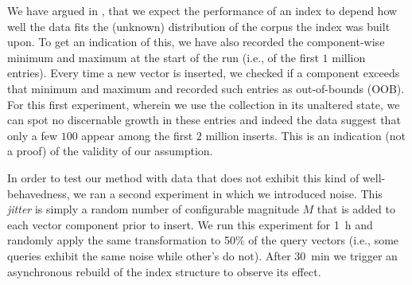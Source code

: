 We have argued in , that we expect the performance of an index to depend how well the data fits the (unknown) distribution of the corpus the index was built upon. To get an indication of this, we have also recorded the component-wise minimum and maximum at the start of the run (i.e., of the first $1$ million entries). Every time a new vector is inserted, we checked if a component exceeds that minimum and maximum and recorded such entries as out-of-bounds (OOB). For this first experiment, wherein we use the collection in its unaltered state, we can spot no discernable growth in these entries and indeed the data suggest that only a few $100$ appear among the first $2$ million inserts. This is an indication (not a proof) of the validity of our assumption.

In order to test our method with data that does not exhibit this kind of well-behavedness, we ran a second experiment in which we introduced noise. This \emph{jitter} is simply a random number of configurable magnitude $M$ that is added to each vector component prior to insert. We run this experiment for \SI{1}{\hour} and randomly apply the same transformation to 50\% of the query vectors (i.e., some queries exhibit the same noise while other's do not). After \SI{30}{\minute} we trigger an asynchronous rebuild of the index structure to observe its effect.

